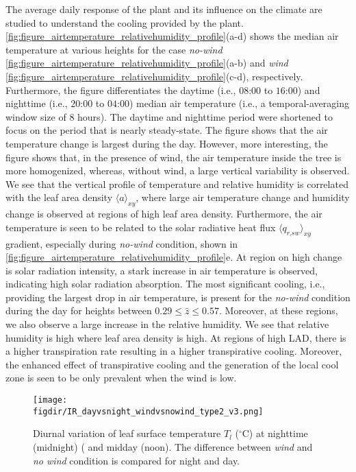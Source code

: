 The average daily response of the plant and its influence on the climate are studied to understand the cooling provided by the plant. \cref{fig:figure_airtemperature_relativehumidity_profile}(a-d) shows the median air temperature at various heights for the case \textit{no-wind} \cref{fig:figure_airtemperature_relativehumidity_profile}(a-b) and \textit{wind} \cref{fig:figure_airtemperature_relativehumidity_profile}(c-d), respectively. Furthermore, the figure differentiates the daytime (i.e., $08$:$00$ to $16$:$00$) and nighttime (i.e., $20$:$00$ to $04$:$00$) median air temperature (i.e., a temporal-averaging window size of 8 hours). The daytime and nighttime period were shortened to focus on the period that is nearly steady-state. The figure shows that the air temperature change is largest during the day. However, more interesting, the figure shows that, in the presence of wind, the air temperature inside the tree is more homogenized, whereas, without wind, a large vertical variability is observed. We see that the vertical profile of temperature and relative humidity is correlated with the leaf area density $\langle a \rangle_{\textit{xy}}$, where large air temperature change and humidity change is observed at regions of high leaf area density. Furthermore, the air temperature is seen to be related to the solar radiative heat flux $\langle q_{\textit{r,sw}} \rangle_{\textit{xy}}$ gradient, especially during \textit{no-wind} condition, shown in \cref{fig:figure_airtemperature_relativehumidity_profile}e. At region on high change is solar radiation intensity, a stark increase in air temperature is observed, indicating high solar radiation absorption. The most significant cooling, i.e., providing the largest drop in air temperature, is present for the \textit{no-wind} condition during the day for heights between $0.29\le \hat{z} \le0.57$. Moreover, at these regions, we also observe a large increase in the relative humidity. We see that relative humidity is high where leaf area density is high. At regions of high LAD, there is a higher transpiration rate resulting in a higher transpirative cooling. Moreover, the enhanced effect of transpirative cooling and the generation of the local cool zone is seen to be only prevalent when the wind is low. 

\begin{sidewaysfigure}[p]
	\centering 
	\texttt{[image: \\figdir/IR\_dayvsnight\_windvsnowind\_type2\_v3.png]}
	\caption{Diurnal variation of leaf surface temperature $T_l$ ($^{\circ}$C) at  nighttime (midnight) (  and midday (noon). The difference between \textit{wind} and \textit{no wind} condition is compared for  night and  day.}
	\label{fig:IR_dayvsnight_windvsnowind_type2_v2}
	
\end{sidewaysfigure}

